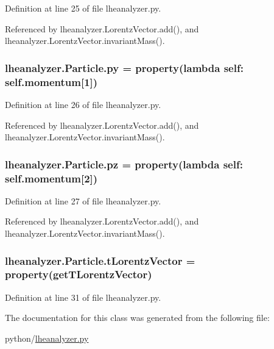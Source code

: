 Definition at line 25 of file lheanalyzer.\-py.



Referenced by lheanalyzer.\-Lorentz\-Vector.\-add(), and lheanalyzer.\-Lorentz\-Vector.\-invariant\-Mass().

\subsubsection[{py}]{\setlength{\rightskip}{0pt plus 5cm}lheanalyzer.\-Particle.\-py = property(lambda self\-: self.\-momentum\mbox{[}1\mbox{]})\hspace{0.3cm}{\ttfamily [static]}}\label{classlheanalyzer_1_1Particle_aaebf738e9976bd94c91a0983e7c9c11e}


Definition at line 26 of file lheanalyzer.\-py.



Referenced by lheanalyzer.\-Lorentz\-Vector.\-add(), and lheanalyzer.\-Lorentz\-Vector.\-invariant\-Mass().

\subsubsection[{pz}]{\setlength{\rightskip}{0pt plus 5cm}lheanalyzer.\-Particle.\-pz = property(lambda self\-: self.\-momentum\mbox{[}2\mbox{]})\hspace{0.3cm}{\ttfamily [static]}}\label{classlheanalyzer_1_1Particle_a4f8bf461663f7f0e9cf264fdd0f40cbe}


Definition at line 27 of file lheanalyzer.\-py.



Referenced by lheanalyzer.\-Lorentz\-Vector.\-add(), and lheanalyzer.\-Lorentz\-Vector.\-invariant\-Mass().

\subsubsection[{t\-Lorentz\-Vector}]{\setlength{\rightskip}{0pt plus 5cm}lheanalyzer.\-Particle.\-t\-Lorentz\-Vector = property({\bf get\-T\-Lorentz\-Vector})\hspace{0.3cm}{\ttfamily [static]}}\label{classlheanalyzer_1_1Particle_ac32abe22b6ec78e2158c36bcd4097ca5}


Definition at line 31 of file lheanalyzer.\-py.



The documentation for this class was generated from the following file\-:\begin{DoxyCompactItemize}
\item 
python/\hyperlink{lheanalyzer_8py}{lheanalyzer.\-py}\end{DoxyCompactItemize}
